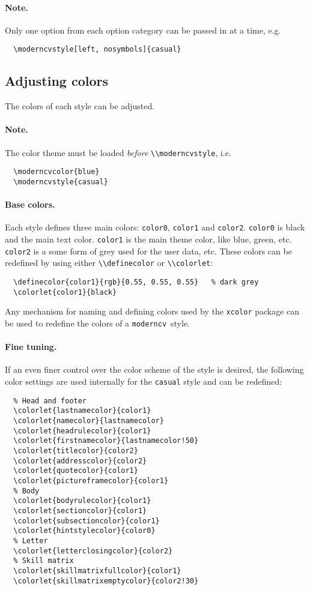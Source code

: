 \documentclass[a4paper, 11pt]{article}
\newcommand{\note}{\paragraph{Note.}}
\newcommand{\code}[1]{\lstinline!#1!}
\newcommand{\moderncv}{\code{moderncv}}
\newcommand{\Moderncv}{\moderncv~}
\begin{document}
\note Only one option from each option category can be passed in at a time, e.g.
\begin{lstlisting}
  \moderncvstyle[left, nosymbols]{casual}
\end{lstlisting}


\subsection{Adjusting colors}
The colors of each style can be adjusted.

\note The color theme must be loaded \emph{before} \code{\\moderncvstyle}, i.e.
\begin{lstlisting}
  \moderncvcolor{blue}
  \moderncvstyle{casual}
\end{lstlisting}

\paragraph{Base colors.}
Each style defines three main colors: \code{color0}, \code{color1} and \code{color2}.
\code{color0} is black and the main text color.
\code{color1} is the main theme color, like blue, green, etc.
\code{color2} is a some form of grey used for the user data, etc.
These colors can be redefined by using either \code{\\definecolor} or \code{\\colorlet}:
\begin{lstlisting}
  \definecolor{color1}{rgb}{0.55, 0.55, 0.55}   % dark grey
  \colorlet{color1}{black}
\end{lstlisting}
Any mechanism for naming and defining colors used by the \code{xcolor} package can be used to redefine the colors of a \Moderncv style.

\paragraph{Fine tuning.}
If an even finer control over the color scheme of the style is desired, the following color settings are used internally for the \code{casual} style and can be redefined:
\begin{lstlisting}
  % Head and footer
  \colorlet{lastnamecolor}{color1}
  \colorlet{namecolor}{lastnamecolor}
  \colorlet{headrulecolor}{color1}
  \colorlet{firstnamecolor}{lastnamecolor!50}
  \colorlet{titlecolor}{color2}
  \colorlet{addresscolor}{color2}
  \colorlet{quotecolor}{color1}
  \colorlet{pictureframecolor}{color1}
  % Body
  \colorlet{bodyrulecolor}{color1}
  \colorlet{sectioncolor}{color1}
  \colorlet{subsectioncolor}{color1}
  \colorlet{hintstylecolor}{color0}
  % Letter
  \colorlet{letterclosingcolor}{color2}
  % Skill matrix
  \colorlet{skillmatrixfullcolor}{color1}
  \colorlet{skillmatrixemptycolor}{color2!30}
\end{lstlisting}
\end{document}
